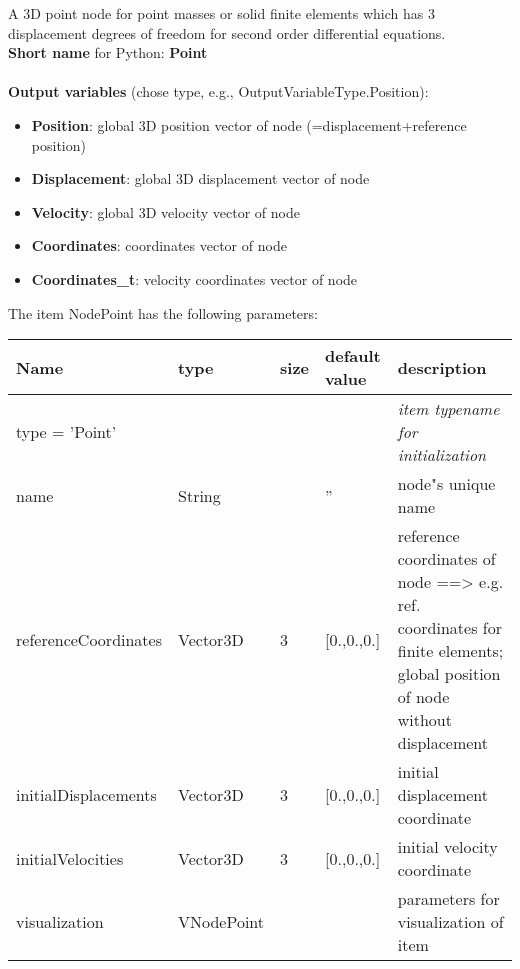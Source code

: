 
A 3D point node for point masses or solid finite elements which has 3 displacement degrees of freedom for second order differential equations.
 \\
{\bf Short name} for Python: {\bf Point}
 \\\\ 
{\bf Output variables} (chose type, e.g., OutputVariableType.Position): 
\begin{itemize}
    \item {\bf Position}: global 3D position vector of node (=displacement+reference position)
    \item {\bf Displacement}: global 3D displacement vector of node
    \item {\bf Velocity}: global 3D velocity vector of node
    \item {\bf Coordinates}: coordinates vector of node
    \item {\bf Coordinates\_t}: velocity coordinates vector of node
\end{itemize}
The item NodePoint has the following parameters:
\begin{center}
  \footnotesize
  \begin{longtable}{| p{4.5cm} | p{2.5cm} | p{0.5cm} | p{2.5cm} | p{6cm} |}
    \hline
    \bf Name & \bf type & \bf size & \bf default value & \bf description \\ \hline
    \multicolumn{4}{l}{\parbox{10cm}{type = 'Point'}} & \multicolumn{1}{l}{\parbox{6cm}{\it item typename for initialization}}\\ \hline
    name &     String &      &     '' &     node"s unique name\\ \hline
    referenceCoordinates &     Vector3D &     3 &     [0.,0.,0.] &     reference coordinates of node ==> e.g. ref. coordinates for finite elements; global position of node without displacement\\ \hline
    initialDisplacements &     Vector3D &     3 &     [0.,0.,0.] &     initial displacement coordinate\\ \hline
    initialVelocities &     Vector3D &     3 &     [0.,0.,0.] &     initial velocity coordinate\\ \hline
    visualization & VNodePoint & & & parameters for visualization of item \\ \hline
	  \end{longtable}
	\end{center}
